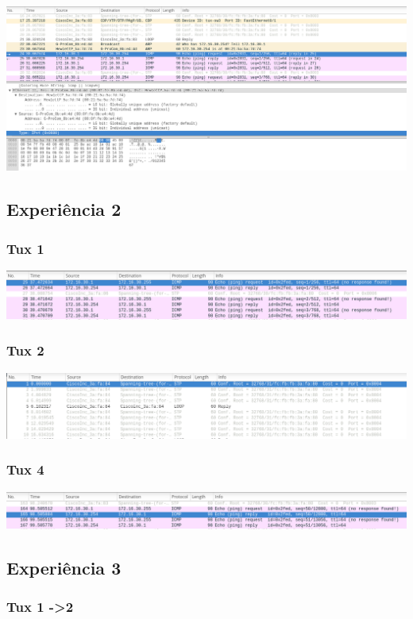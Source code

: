 \documentclass[a4paper]{article}
\begin{document}
\includegraphics[scale=0.35]{Exp1.png}

\subsection{Experiência 2}

\subsubsection{Tux 1}
\includegraphics[scale=0.35]{Exp2-tux1.png}

\subsubsection{Tux 2}
\includegraphics[scale=0.35]{Exp2-tux2.png}

\subsubsection{Tux 4}
\includegraphics[scale=0.35]{Exp2-tux4.png}

\subsection{Experiência 3}
\subsubsection{Tux 1 -\textgreater 2}
\end{document}

